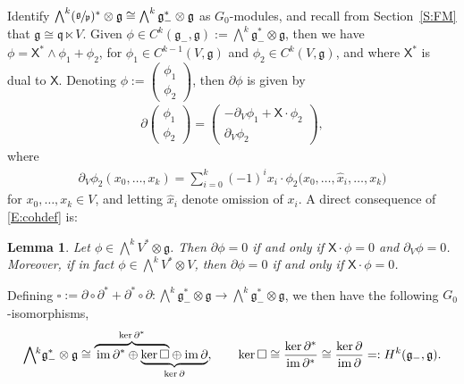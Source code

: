 \documentclass[pdftex]{sigma}%
\newcommand\tensor{\otimes}
\DeclareMathOperator{\img}{im}
\newcommand{\g}{\mathfrak{g}}
\newcommand\fp{\mathfrak{p}}
\newcommand\fq {\mathfrak{q}}
\newcommand\sfX{\mathsf{X}}
\numberwithin{equation}{section}
\newtheorem{Lemma}[Theorem]{Lemma}
\begin{document}
Identify $\bigwedge^k (\sfrac{\g}{\fp})^* \otimes \g \cong \bigwedge^k \g_-^* \otimes \g$ as $G_0$-modules, and recall from Section~\ref{S:FM} that $\g \cong \fq \ltimes V$. Given $\phi \in C^k(\g_-,\g):=\bigwedge^k\g_-^* \tensor \g$, then we have $\phi = \sfX^* \wedge \phi_1 + \phi_2$, for $\phi_1 \in C^{k-1}(V,\g)$ and $\phi_2 \in C^k(V,\g)$, and where $\sfX^*$ is dual to $\sfX$. Denoting $\phi := \left(\begin{smallmatrix}
\phi_1\\
\phi_2
\end{smallmatrix}\right)$, then $\partial \phi $ is given by \cite[Lemma~3.4]{CDT2020}
\begin{align}\label{E:cohdef}
\partial \begin{pmatrix}
\phi_1\\
\phi_2
\end{pmatrix} = \begin{pmatrix}
-\partial_V \phi_1 + \sfX \cdot \phi_2\\
\partial_V \phi_2
\end{pmatrix},
\end{align}
where
\begin{align*}
\partial_V \phi_2(x_0,\dots,x_k) = \sum_{i=0}^k (-1)^i x_i \cdot \phi_2\bigl(x_0,\dots,\widehat{x}_i,\dots,x_k\bigr)
\end{align*}
 for $x_0,\dots,x_k \in V$, and letting $\widehat{x}_i$ denote omission of $x_i$. A direct consequence of \eqref{E:cohdef} is:
 \begin{Lemma}\label{L:X-ann}
Let $\phi\in \bigwedge^k V^*\tensor \g$. Then $\partial \phi = 0$ if and only if $\sfX \cdot \phi = 0$ and $\partial_V \phi = 0$. Moreover, if in fact $\phi \in \bigwedge^k V^* \tensor V$, then $\partial \phi = 0$ if and only if $\sfX \cdot \phi = 0$.
\end{Lemma}

 Defining $\square:=\partial \circ \partial^{\ast} + \partial^{\ast}\circ\partial \colon\bigwedge^k \g_-^* \otimes \g \to \bigwedge^k \g_-^* \otimes \g$, we then have the following $G_0$-isomorphisms,
\begin{align}\label{E:G0iso}
\bigwedge{}^{\!\!k}{\g_{-}^{\ast}\tensor \g} \cong
\rlap{$\overbrace{\phantom{\,\img \partial^{\ast} \oplus \ker\square}}^{\ker \partial^{\ast}}$}\img \partial^{\ast} \oplus
\underbrace{\ker \square \oplus \img \partial}_{\ker \partial},\qquad
\ker \square \cong \frac{\ker \partial^{\ast}}{\img \partial^{\ast}}\cong \frac{\ker \partial}{\img \partial}=:H^k(\g_{-},\g).
\end{align}
\end{document}
